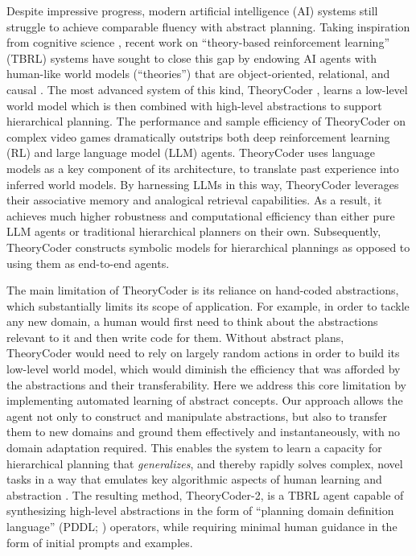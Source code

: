 \documentclass{article}
\theoremstyle{plain}
\theoremstyle{definition}
\theoremstyle{remark}
\begin{document}
Despite impressive progress, modern artificial intelligence (AI) systems still struggle to achieve comparable fluency with abstract planning. Taking inspiration from cognitive science \citep{gopnik1997words,gerstenberg17,lake2017building}, recent work on ``theory-based reinforcement learning'' (TBRL) systems have sought to close this gap by endowing AI agents with human-like world models (``theories'') that are object-oriented, relational, and causal \citep{tsividis2021human,tang2024worldcoder}. The most advanced system of this kind, TheoryCoder \citep{ahmed2025synthesizing}, learns a low-level world model which is then combined with high-level abstractions to support hierarchical planning. The performance and sample efficiency of TheoryCoder on complex video games dramatically outstrips both deep reinforcement learning (RL) and large language model (LLM) agents. TheoryCoder uses language models as a key component of its architecture, to translate past experience into inferred world models.  By harnessing LLMs in this way, TheoryCoder leverages their associative memory and analogical retrieval capabilities. As a result, it achieves much higher robustness and computational efficiency than either pure LLM agents or traditional hierarchical planners on their own. Subsequently, TheoryCoder constructs symbolic models for hierarchical plannings as opposed to using them as end-to-end agents.

The main limitation of TheoryCoder is its reliance on hand-coded abstractions, which substantially limits its scope of application. For example, in order to tackle any new domain, a human would first need to think about the abstractions relevant to it and then write code for them. Without abstract plans, TheoryCoder would need to rely on largely random actions in order to build its low-level world model, which would diminish the efficiency that was afforded by the abstractions and their transferability. Here we address this core limitation by implementing automated learning of abstract concepts.
Our approach allows the agent not only to construct and manipulate abstractions, but also
to transfer them to new domains and ground them effectively and instantaneously, with no domain adaptation required.  This enables the system to learn a capacity for hierarchical planning that {\em generalizes}, and thereby rapidly solves complex, novel tasks in a way that emulates key algorithmic aspects of human learning and abstraction \citep{tomov2020discovery}.
The resulting method, TheoryCoder-2, is a TBRL agent capable of synthesizing high-level abstractions in the form of ``planning domain definition language'' (PDDL; \citet{ghallab1998pddl}) operators, while requiring minimal human guidance in the form of initial prompts and examples.
\end{document}
